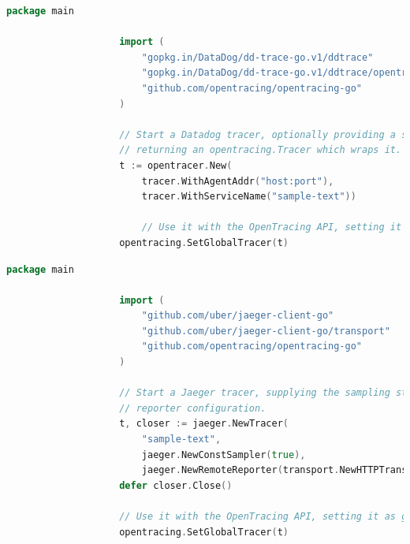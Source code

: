 \documentclass[12pt,pdftex,titlepage]{report}
\begin{document}
                \begin{lstlisting}[caption=Example Golang snippet of instatiating a Datadog OpenTracing compatible tracer., language=Go, gobble=20]
                    package main

                    import (
                        "gopkg.in/DataDog/dd-trace-go.v1/ddtrace"
                        "gopkg.in/DataDog/dd-trace-go.v1/ddtrace/opentracer"
                        "github.com/opentracing/opentracing-go"
                    )

                    // Start a Datadog tracer, optionally providing a set of options,
                    // returning an opentracing.Tracer which wraps it.
                    t := opentracer.New(
                        tracer.WithAgentAddr("host:port"),
                        tracer.WithServiceName("sample-text"))

                        // Use it with the OpenTracing API, setting it as global.
                    opentracing.SetGlobalTracer(t)
                \end{lstlisting}

                \newpage
                \begin{lstlisting}[caption=Example Golang snippet of instatiating a Jaeger OpenTracing compatible tracer., language=Go, gobble=20]
                    package main

                    import (
                        "github.com/uber/jaeger-client-go"
                        "github.com/uber/jaeger-client-go/transport"
                        "github.com/opentracing/opentracing-go"
                    )

                    // Start a Jaeger tracer, supplying the sampling strategy and the
                    // reporter configuration.
                    t, closer := jaeger.NewTracer(
                        "sample-text",
                        jaeger.NewConstSampler(true),
                        jaeger.NewRemoteReporter(transport.NewHTTPTransport("host:port")))
                    defer closer.Close()

                    // Use it with the OpenTracing API, setting it as global.
                    opentracing.SetGlobalTracer(t)                    
                \end{lstlisting}
\end{document}
